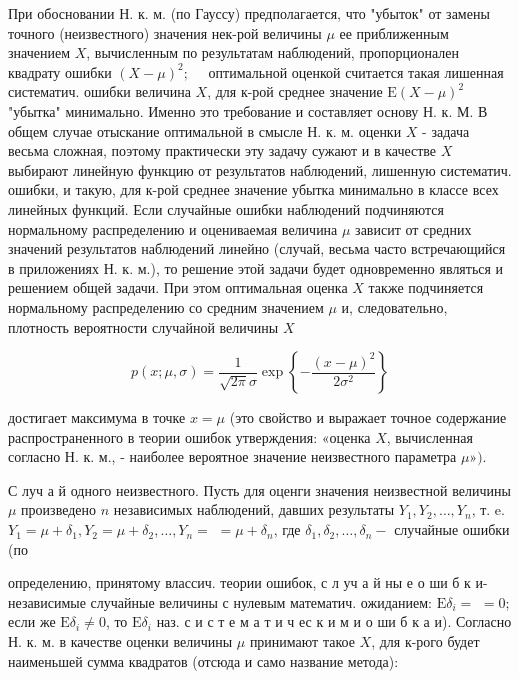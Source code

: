 \documentclass[10pt]{article}
\begin{document}
При обосновании Н. к. м. (по Гауссу) предполагается, что "убыток" от замены точного (неизвестного) значения нек-рой величины $\mu$ ее приближенным значением $X$, вычисленным по результатам наблюдений, пропорционален квадрату ошибки $(X-\mu)^{2} ; \quad$ оптимальной оценкой считается такая лишенная систематич. ошибки величина $X$, для к-рой среднее значение $\mathrm{E}(X-\mu)^{2}$ "убытка" минимально. Именно это требование и составляет основу Н. к. М. В общем случае отыскание оптимальной в смысле Н. к. м. оценки $X$ - задача весьма сложная, поэтому практически эту задачу сужают и в качестве $X$ выбирают линейную функцию от результатов наблюдений, лишенную систематич. ошибки, и такую, для к-рой среднее значение убытка минимально в классе всех линейных функций. Если случайные ошибки наблюдений подчиняются нормальному распределению и оцениваемая величина $\mu$ зависит от средних значений результатов наблюдений линейно (случай, весьма часто встречающийся в приложениях Н. к. м.), то решение этой задачи будет одновременно являться и решением общей задачи. При этом оптимальная оценка $X$ также подчиняется нормальному распределению со средним значением $\mu$ и, следовательно, плотность вероятности случайной величины $X$



\[

p(x ; \mu, \sigma)=\frac{1}{\sqrt{2 \pi} \sigma} \exp \left\{-\frac{(x-\mu)^{2}}{2 \sigma^{2}}\right\}

\]



достигает максимума в точке $x=\mu$ (это свойство и выражает точное содержание распространенного в теории ошибок утверждения: «оценка $X$, вычисленная согласно Н. к. м., - наиболее вероятное значение неизвестного параметра $\mu »)$.



С луч а й одного неизвестного. Пусть для оценги значения неизвестной величины $\mu$ произведено $n$ независимых наблюдений, давших результаты $Y_{1}, Y_{2}, \ldots, Y_{n}$, т. e. $Y_{1}=\mu+\delta_{1}, Y_{2}=\mu+\delta_{2}, \ldots, Y_{n}=$ $=\mu+\delta_{n}$, где $\delta_{1}, \delta_{2}, \ldots, \delta_{n}-$ случайные ошибки (по

определению, принятому влассич. теории ошибок, с л уч а й ны е о ши б к и-независимые случайные величины с нулевым математич. ожиданием: $\mathrm{E} \delta_{i}=$ $=0$; если же $\mathrm{E} \delta_{i} \neq 0$, то $\mathrm{E} \delta_{i}$ наз. с и с т е м а т и ч ес к и м и о ши б к а и). Согласно Н. к. м. в качестве оценки величины $\mu$ принимают такое $X$, для к-рого будет наименьшей сумма квадратов (отсюда и само название метода):
\end{document}
